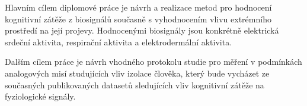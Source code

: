 Hlavním cílem diplomové práce je návrh a realizace metod pro hodnocení
kognitivní zátěže z biosignálů současně s vyhodnocením vlivu extrémního
prostředí na její projevy. Hodnocenými biosignály jsou konkrétně elektrická
srdeční aktivita, respirační aktivita a elektrodermální aktivita.

Dalším cílem práce je návrh vhodného protokolu studie pro měření v podmínkách
analogových misí studujících vliv izolace člověka, který bude vycházet ze
současných publikovaných datasetů sledujících vliv kognitivní zátěže na
fyziologické signály.